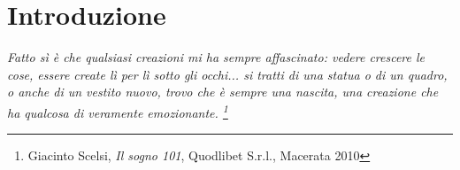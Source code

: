 
\chapter*{Introduzione}


\begin{flushright}
		\textit{Fatto sì è che qualsiasi creazioni mi ha sempre affascinato: vedere crescere le cose, essere create lì per lì sotto gli occhi... si tratti di una statua o di un quadro, o anche di un vestito nuovo, trovo che è sempre una nascita, una creazione che ha qualcosa di veramente emozionante. \footnote{Giacinto Scelsi, \textit{Il sogno 101}, Quodlibet S.r.l., Macerata 2010}}
	\end{flushright}

